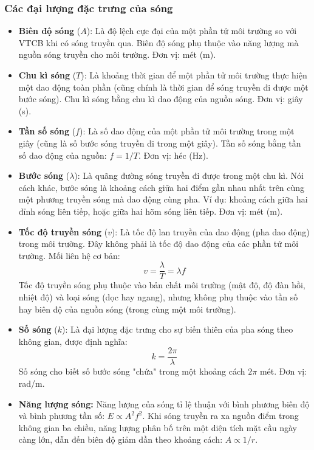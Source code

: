 \subsubsection{Các đại lượng đặc trưng của sóng}

\begin{itemize}
    \item \textbf{Biên độ sóng} ($A$): Là độ lệch cực đại của một phần tử môi trường so với VTCB khi có sóng truyền qua. Biên độ sóng phụ thuộc vào năng lượng mà nguồn sóng truyền cho môi trường. Đơn vị: mét (m).
    
    \item \textbf{Chu kì sóng} ($T$): Là khoảng thời gian để một phần tử môi trường thực hiện một dao động toàn phần (cũng chính là thời gian để sóng truyền đi được một bước sóng). Chu kì sóng bằng chu kì dao động của nguồn sóng. Đơn vị: giây (s).
    
    \item \textbf{Tần số sóng} ($f$): Là số dao động của một phần tử môi trường trong một giây (cũng là số bước sóng truyền đi trong một giây). Tần số sóng bằng tần số dao động của nguồn: $f = 1/T$. Đơn vị: héc (Hz).
    
    \item \textbf{Bước sóng} ($\lambda$): Là quãng đường sóng truyền đi được trong một chu kì. Nói cách khác, bước sóng là khoảng cách giữa hai điểm gần nhau nhất trên cùng một phương truyền sóng mà dao động cùng pha. Ví dụ: khoảng cách giữa hai đỉnh sóng liên tiếp, hoặc giữa hai hõm sóng liên tiếp. Đơn vị: mét (m).
    
    \item \textbf{Tốc độ truyền sóng} ($v$): Là tốc độ lan truyền của dao động (pha dao động) trong môi trường. Đây không phải là tốc độ dao động của các phần tử môi trường. Mối liên hệ cơ bản:
    \[
        v = \dfrac{\lambda}{T} = \lambda f
    \]
    Tốc độ truyền sóng phụ thuộc vào bản chất môi trường (mật độ, độ đàn hồi, nhiệt độ) và loại sóng (dọc hay ngang), nhưng không phụ thuộc vào tần số hay biên độ của nguồn sóng (trong cùng một môi trường).
    
    \item \textbf{Số sóng} ($k$): Là đại lượng đặc trưng cho sự biến thiên của pha sóng theo không gian, được định nghĩa:
    \[
        k = \dfrac{2\pi}{\lambda}
    \]
    Số sóng cho biết số bước sóng "chứa" trong một khoảng cách $2\pi$ mét. Đơn vị: rad/m.
    
    \item \textbf{Năng lượng sóng:} Năng lượng của sóng tỉ lệ thuận với bình phương biên độ và bình phương tần số: $E \propto A^2 f^2$. Khi sóng truyền ra xa nguồn điểm trong không gian ba chiều, năng lượng phân bố trên một diện tích mặt cầu ngày càng lớn, dẫn đến biên độ giảm dần theo khoảng cách: $A \propto 1/r$.
\end{itemize}

